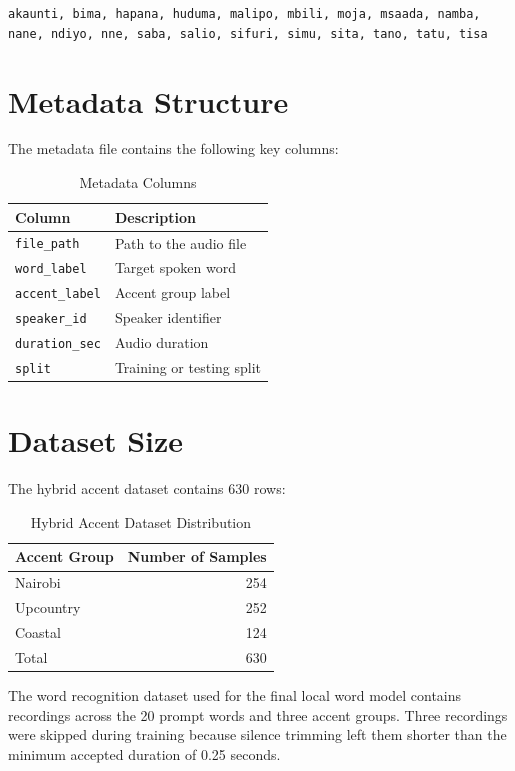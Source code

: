 \documentclass[12pt,a4paper]{report}
\begin{document}
\begin{center}
\texttt{akaunti, bima, hapana, huduma, malipo, mbili, moja, msaada, namba, nane, ndiyo, nne, saba, salio, sifuri, simu, sita, tano, tatu, tisa}
\end{center}

\section{Metadata Structure}
The metadata file contains the following key columns:

\begin{table}[h]
\centering
\caption{Metadata Columns}
\begin{tabular}{ll}
\toprule
\textbf{Column} & \textbf{Description} \\
\midrule
\texttt{file\_path} & Path to the audio file \\
\texttt{word\_label} & Target spoken word \\
\texttt{accent\_label} & Accent group label \\
\texttt{speaker\_id} & Speaker identifier \\
\texttt{duration\_sec} & Audio duration \\
\texttt{split} & Training or testing split \\
\bottomrule
\end{tabular}
\end{table}

\section{Dataset Size}
The hybrid accent dataset contains 630 rows:

\begin{table}[h]
\centering
\caption{Hybrid Accent Dataset Distribution}
\begin{tabular}{lr}
\toprule
\textbf{Accent Group} & \textbf{Number of Samples} \\
\midrule
Nairobi & 254 \\
Upcountry & 252 \\
Coastal & 124 \\
\midrule
Total & 630 \\
\bottomrule
\end{tabular}
\end{table}

The word recognition dataset used for the final local word model contains recordings across the 20 prompt words and three accent groups. Three recordings were skipped during training because silence trimming left them shorter than the minimum accepted duration of 0.25 seconds.
\end{document}
